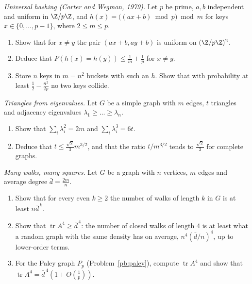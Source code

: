 \begin{exercise}[$\star$]\label{pb:hashing}
\emph{Universal hashing (Carter and Wegman, 1979).} Let $p$ be prime, $a,b$ independent and uniform in $\Z/p\Z$, and
$h(x)=\bigl((ax+b)\bmod p\bigr)\bmod m$ for keys $x\in\{0,\dots,p-1\}$, where $2\le m\le p$.
\begin{enumerate}[label=(\alph*)]
\item Show that for $x\ne y$ the pair $(ax+b,ay+b)$ is uniform on $(\Z/p\Z)^2$.
\item Deduce that $P(h(x)=h(y))\le\frac1m+\frac1p$ for $x\ne y$.
\item Store $n$ keys in $m=n^2$ buckets with such an $h$. Show that with probability at least $\frac12-\frac{n^2}{2p}$ no two keys
collide.
\end{enumerate}
\end{exercise}

\begin{exercise}[$\star\star$]\label{pb:triangleseigen}
\emph{Triangles from eigenvalues.} Let $G$ be a simple graph with $m$ edges, $t$ triangles and adjacency eigenvalues
$\lambda_1\ge\dots\ge\lambda_n$.
\begin{enumerate}[label=(\alph*)]
\item Show that $\sum_i\lambda_i^2=2m$ and $\sum_i\lambda_i^3=6t$.
\item Deduce that $t\le\frac{\sqrt2}3m^{3/2}$, and that the ratio $t/m^{3/2}$ tends to $\frac{\sqrt2}3$ for complete graphs.
\end{enumerate}
\end{exercise}

\begin{exercise}[$\star\star$]\label{pb:walks}
\emph{Many walks, many squares.} Let $G$ be a graph with $n$ vertices, $m$ edges and average degree $\bar d=\frac{2m}n$.
\begin{enumerate}[label=(\alph*)]
\item Show that for every even $k\ge2$ the number of walks of length $k$ in $G$ is at least $n\bar d^{\,k}$.
\item Show that $\operatorname{tr}A^4\ge\bar d^{\,4}$: the number of closed walks of length $4$ is at least what a random graph with the same
density has on average, $n^4(\bar d/n)^4$, up to lower-order terms.
\item For the Paley graph $P_p$ (Problem~\ref{pb:paley}), compute $\operatorname{tr}A^4$ and show that $\operatorname{tr}A^4=\bar d^{\,4}(1+O(\frac1p))$.
\end{enumerate}
\end{exercise}

